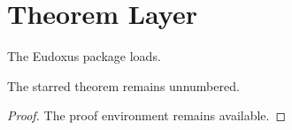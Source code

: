 \documentclass{amsart}
\begin{document}
\section{Theorem Layer}
\begin{theorem}The Eudoxus package loads.\end{theorem}
\begin{theorem*}The starred theorem remains unnumbered.\end{theorem*}
\begin{proof}The proof environment remains available.\end{proof}
\end{document}
